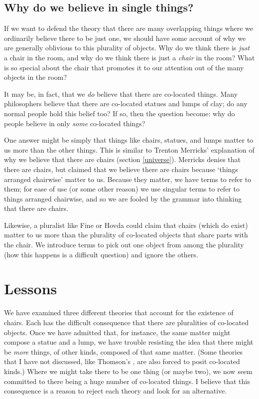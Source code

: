 \documentclass[11pt]{article}
\begin{document}
\begin{spacing}{1.5}
\subsection{Why do we believe in single things?}
\label{exp-single}
If we want to defend the theory that there are many overlapping things
where we ordinarily believe there to be just one, we should have some
account of why we are generally oblivious to this plurality of
objects.  Why do we think there is {\em just} a chair in the room, and
why do we think there is just a {\em chair} in the room?  What is so
special about the chair that promotes it to our attention out of the
many objects in the room?

It may be, in fact, that we {\em do} believe that there are co-located
things.  Many philosophers believe that there are co-located statues
and lumps of clay; do any normal people hold this belief too?
If so, then the question become: why do people believe in only {\em
  some} co-located things?

One answer might be simply that things like chairs, statues, and lumps
matter to us more than the other things.  This is similar to Trenton
Merricks' explanation of why we believe that there are chairs (section
\ref{universe}).  Merricks denies that there are chairs, but claimed
that we believe there are chairs because `things arranged chairwise'
matter to us.  Because they matter, we have terms to refer to them;
for ease of use (or some other reason) we use singular terms to refer
to things arranged chairwise, and so we are fooled by the grammar into
thinking that there are chairs.

Likewise, a pluralist like Fine or Hovda could claim that chairs
(which do exist) matter to us more than the plurality of co-located
objects that share parts with the chair.  We introduce terms to pick
out one object from among the plurality (how this happens is a
difficult question) and ignore the others.

\section{Lessons}
\label{lessons-p}
We have examined three different theories that account for the
existence of chairs.  Each has the difficult consequence that there
are pluralities of co-located objects.  Once we have admitted that,
for instance, the same matter might compose a statue and a lump, we
have trouble resisting the idea that there might be {\em more} things,
of other kinds, composed of that same matter.  (Some theories that I
have not discussed, like Thomson's \citeyearpar{thomson1998a}, are
also forced to posit co-located kinds.)  Where we might take there to
be one thing (or maybe two), we now seem committed to there being a
huge number of co-located things.  I believe that this consequence is
a reason to reject each theory and look for an alternative.


\end{spacing}
\end{document}
